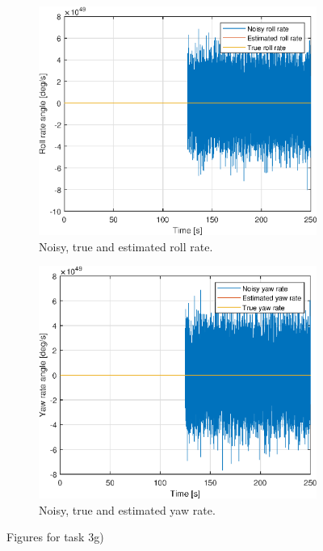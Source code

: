 \begin{figure}[ht]
\begin{subfigure}[b]{0.45\textwidth}
		\includegraphics[width=\textwidth]{figures/3g/roll_rate_p.eps}
		\caption{Noisy, true and estimated roll rate. }
		\label{fig:3g_roll_rate_p}
	\end{subfigure}
	\begin{subfigure}[b]{0.45\textwidth}
		\includegraphics[width=\textwidth]{figures/3g/yaw_rate_r.eps}
		\caption{Noisy, true and estimated yaw rate. }
		\label{fig:3g_yaw_rate_r}
	\end{subfigure}		
	\caption{Figures for task 3g)}\label{fig:3g}
\end{figure}
